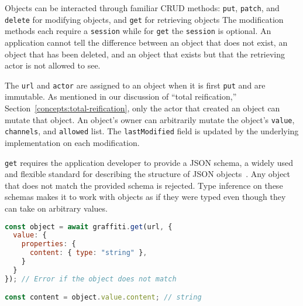 Objects can be interacted through familiar CRUD methods:
\texttt{put}, \texttt{patch}, and \texttt{delete} for modifying objects,
and \texttt{get} for retrieving objects
The modification methods each require a \texttt{session} while
for \texttt{get} the \texttt{session} is optional.
An application cannot tell the difference between an object that does not exist,
an object that has been deleted, and an object that exists but that the retrieving actor
is not allowed to see.

The \texttt{url} and \texttt{actor} are assigned to an object when it is first \texttt{put}
and are immutable.
As mentioned in our discussion of ``total reification,'' Section~\ref{concepts:total-reification},
only the actor that created an object can mutate that object.
An object's owner can arbitrarily mutate the object's
\texttt{value}, \texttt{channels}, and \texttt{allowed} list.
The \texttt{lastModified} field is updated by the underlying implementation on each modification.

\texttt{get} requires the application developer to provide
a JSON schema, a widely used and flexible standard for describing
the structure of JSON objects~\cite{jsonschema}.
Any object that does not match the provided schema is rejected.
Type inference on these schemas makes it to work with objects as
if they were typed even though they can take on arbitrary values.

\begin{lstlisting}[language=javascript]
const object = await graffiti.get(url, {
  value: {
    properties: {
      content: { type: "string" },
    }
  }
}); // Error if the object does not match

const content = object.value.content; // string
\end{lstlisting}







